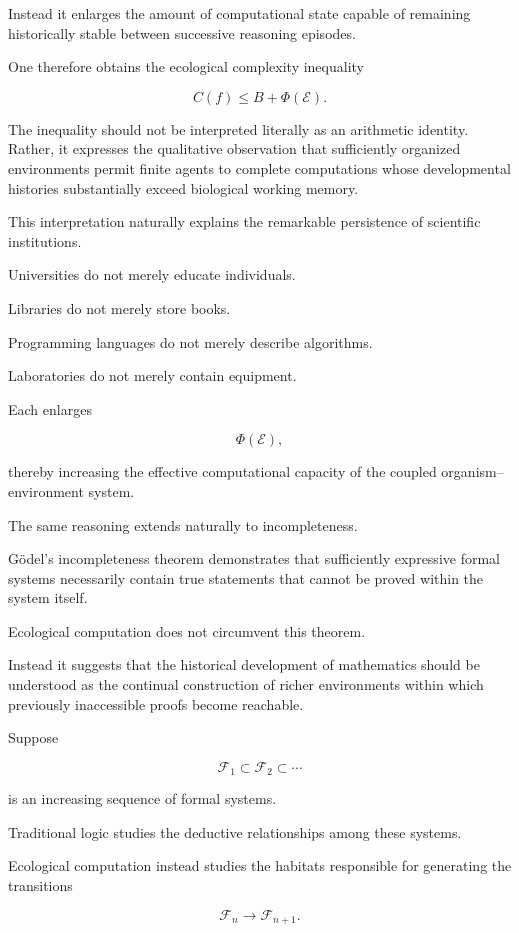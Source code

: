 \documentclass[12pt,oneside]{article}
\theoremstyle{remark}
\begin{document}
Instead it enlarges the amount of computational state capable of remaining
historically stable between successive reasoning episodes.

One therefore obtains the ecological complexity inequality

\[
C(f)
\leq
B+\Phi(\mathcal E).
\]

The inequality should not be interpreted literally as an arithmetic identity.
Rather, it expresses the qualitative observation that sufficiently organized
environments permit finite agents to complete computations whose developmental
histories substantially exceed biological working memory.

This interpretation naturally explains the remarkable persistence of scientific
institutions.

Universities do not merely educate individuals.

Libraries do not merely store books.

Programming languages do not merely describe algorithms.

Laboratories do not merely contain equipment.

Each enlarges

\[
\Phi(\mathcal E),
\]

thereby increasing the effective computational capacity of the coupled
organism--environment system.

The same reasoning extends naturally to incompleteness.

Gödel's incompleteness theorem demonstrates that sufficiently expressive formal
systems necessarily contain true statements that cannot be proved within the
system itself.

Ecological computation does not circumvent this theorem.

Instead it suggests that the historical development of mathematics should be
understood as the continual construction of richer environments within which
previously inaccessible proofs become reachable.

Suppose

\[
\mathcal F_1
\subset
\mathcal F_2
\subset
\cdots
\]

is an increasing sequence of formal systems.

Traditional logic studies the deductive relationships among these systems.

Ecological computation instead studies the habitats responsible for generating
the transitions

\[
\mathcal F_n
\rightarrow
\mathcal F_{n+1}.
\]
\end{document}

